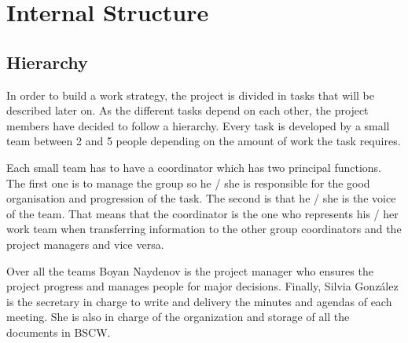 \section{Internal Structure}


\subsection{Hierarchy}

In order to build a work strategy, the project is divided in tasks that will be described later on. As the different tasks depend on each other, the project members have decided to follow a hierarchy. Every task is developed by a small team between 2 and 5 people depending on the amount of work the task requires.
\newline

Each small team has to have a coordinator which has two principal functions. The first one is to manage the group so he / she is responsible for the good organisation and progression of the task. The second is that he / she is the voice of the team. That means that the coordinator is the one who represents his / her work team when transferring information to the other group coordinators and the project managers and vice versa.
\newline

Over all the teams Boyan Naydenov is the project manager who ensures the project progress and manages people for major decisions. Finally, Silvia Gonz\'{a}lez is the secretary in charge to write and delivery the minutes and agendas of each meeting. She is also in charge of the organization and storage of all the documents in BSCW. \newline
 
